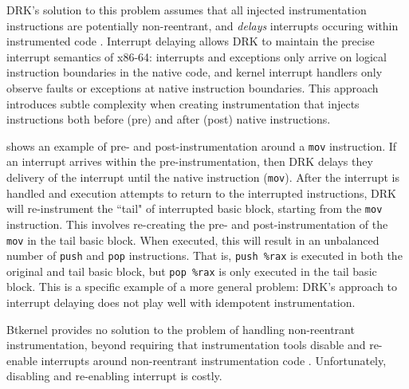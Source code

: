 \documentclass[preprint]{sigplanconf}
\begin{document}
DRK's solution to this problem assumes that all injected instrumentation instructions are potentially non-reentrant, and \emph{delays} interrupts occuring within instrumented code \cite{DRK}. Interrupt delaying allows DRK to maintain the precise interrupt semantics of x86-64: interrupts and exceptions only arrive on logical instruction boundaries in the native code, and kernel interrupt handlers only observe faults or exceptions at native instruction boundaries. This approach introduces subtle complexity when creating instrumentation that injects instructions both before (pre) and after (post) native instructions.

 shows an example of pre- and post-instrumentation around a \texttt{mov} instruction. If an interrupt arrives within the pre-instrumentation, then DRK delays they delivery of the interrupt until the native instruction (\texttt{mov}). After the interrupt is handled and execution attempts to return to the interrupted instructions, DRK will re-instrument the ``tail" of interrupted basic block, starting from the \texttt{mov} instruction. This involves re-creating the pre- and post-instrumentation of the \texttt{mov} in the tail basic block. When executed, this will result in an unbalanced number of \texttt{push} and \texttt{pop} instructions. That is, \texttt{push \%rax} is executed in both the original and tail basic block, but \texttt{pop \%rax} is only executed in the tail basic block. This is a specific example of a more general problem: DRK's approach to interrupt delaying does not play well with idempotent instrumentation.


Btkernel provides no solution to the problem of handling non-reentrant instrumentation, beyond requiring that instrumentation tools disable and re-enable interrupts around non-reentrant instrumentation code \cite{btkernel}. Unfortunately, disabling and re-enabling interrupt is costly.
\end{document}
